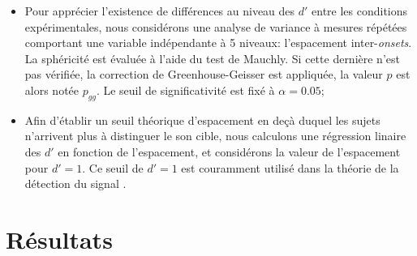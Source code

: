 \begin{itemize}
\item Pour apprécier l'existence de différences au niveau des $d'$ entre les conditions expérimentales, nous considérons une analyse de variance à mesures répétées comportant une variable indépendante à 5 niveaux: l'espacement inter-\emph{onsets}. La sphéricité est évaluée à l'aide du test de Mauchly. Si cette dernière n'est pas vérifiée, la correction de Greenhouse-Geisser est appliquée, la valeur $p$ est alors notée $p_{gg}$. Le seuil de significativité est fixé à $\alpha=0.05$;
\item Afin d'établir un seuil théorique d'espacement en deçà duquel les sujets n'arrivent plus à distinguer le son cible, nous calculons une régression linaire des $d'$ en fonction de l'espacement, et considérons la valeur de l'espacement pour $d'=1$. Ce seuil de $d'=1$ est couramment utilisé dans la théorie de la détection du signal \citep{macmillan2004detection}.
\end{itemize}

\section{Résultats}

